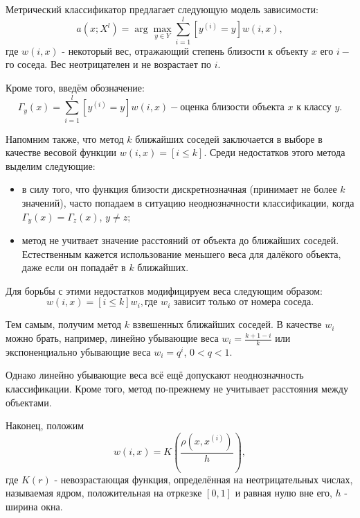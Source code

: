 Метрический классификатор предлагает следующую модель зависимости:
\begin{equation*}
	\displaystyle a(x; X^l) = \arg\max_{y\in Y} \sum\limits_{i=1}^l[y^{(i)}=y]w(i,x), 
\end{equation*}
где $w(i,x)$ - некоторый вес, отражающий степень близости к объекту $x$ его $i-$го соседа. Вес неотрицателен и не возрастает по $i$. 

Кроме того, введём обозначение:
\begin{equation*}
	\displaystyle \Gamma_y(x) = \sum\limits_{i=1}^l[y^{(i)}=y]w(i,x) - \text{оценка близости объекта $x$ к классу $y$}. 
\end{equation*}

Напомним также, что метод $k$ ближайших соседей заключается в выборе в качестве весовой функции $w(i,x) = [i\le k]$. Среди недостатков этого метода выделим следующие:
\begin{itemize}
	\item в силу того, что функция близости дискретнозначная (принимает не более $k$ значений), часто попадаем в ситуацию неоднозначности классификации, когда $\Gamma_y(x) = \Gamma_z(x)$, $y\ne z$;
	\item метод не учитвает значение расстояний от объекта до ближайших соседей. Естественным кажется использование меньшего веса для далёкого объекта, даже если он попадаёт в $k$ ближайших.
\end{itemize}

Для борьбы с этими недостатков модифицируем веса следующим образом:
\begin{equation*}
	w(i,x) = [i\le k]w_i, \text{где $w_i$ зависит только от номера соседа}.
\end{equation*}

Тем самым, получим метод $k$ взвешенных ближайших соседей. В качестве $w_i$ можно брать, например, линейно убывающие веса $\displaystyle w_i = \frac{k+1-i}{k}$ или экспоненциально убывающие веса $w_i = q^i$, $0 < q < 1$.

Однако линейно убывающие веса всё ещё допускают неоднозначность классификации. Кроме того, метод по-прежнему не учитывает расстояния между объектами. 

Наконец, положим
\begin{equation*}
	\displaystyle w(i,x) = K\left(\frac{\rho(x, x^{(i)})}{h}\right),
\end{equation*}
где $K(r)$ - невозрастающая функция, определённая на неотрицательных числах, называемая ядром, положительная на отркезке $[0,1]$ и равная нулю вне его, $h$ - ширина окна. 

